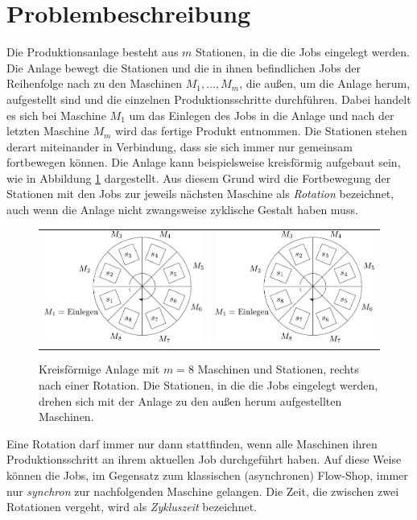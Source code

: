 \documentclass{scrreprt}
\begin{document}
\section{Problembeschreibung}
\label{sec:Problembeschreibung}
Die Produktionsanlage be\-steht aus $m$ Stationen, in die die Jobs eingelegt werden.
Die Anlage bewegt die Stationen und die in ihnen befindlichen Jobs der Reihenfolge nach zu den Maschinen $M_1,\ldots,M_m$,
die außen, um die Anlage herum, aufgestellt sind und die einzelnen Produktionsschritte durchführen.
Dabei handelt es sich bei Maschine $M_1$ um das Einlegen des Jobs in die Anlage und nach der letzten Maschine $M_m$ wird das fertige Produkt entnommen.
Die Stationen stehen derart miteinander in Verbindung, dass sie sich immer nur gemeinsam fortbewegen können.
Die Anlage kann beispielsweise kreisförmig aufgebaut sein, wie in Abbildung \ref{abb:Anlage} dargestellt.
Aus diesem Grund wird die Fortbewegung der Stationen mit den Jobs zur jeweils nächsten Maschine als \textit{Rotation} bezeichnet,
auch wenn die Anlage nicht zwangsweise zyklische Gestalt haben muss.
\begin{figure}[h]
    \begin{center}
        \begin{tabular}{cc}
            \includegraphics[width=.45\textwidth]{graphics/anlage.pdf}
            & \includegraphics[width=.45\textwidth]{graphics/anlage2.pdf}
        \end{tabular}
    \end{center}
    \caption{
        \label{abb:Anlage}
        Kreisförmige Anlage mit $m=8$ Maschinen und Stationen, rechts nach einer Rotation. 
        Die Stationen, in die die Jobs eingelegt werden, drehen sich mit der Anlage zu den außen herum aufgestellten Maschinen.
    }
\end{figure}
Eine Rotation darf immer nur dann stattfinden, wenn alle Maschinen ihren Produktionsschritt an ihrem aktuellen Job
durchgeführt haben. Auf diese Weise können die Jobs, im Gegensatz zum klassischen (asynchronen) Flow-Shop, 
immer nur \textit{synchron} zur nachfolgenden Maschine gelangen.
Die Zeit, die zwischen zwei Rotationen vergeht, wird als \textit{Zykluszeit} bezeichnet.
\end{document}
